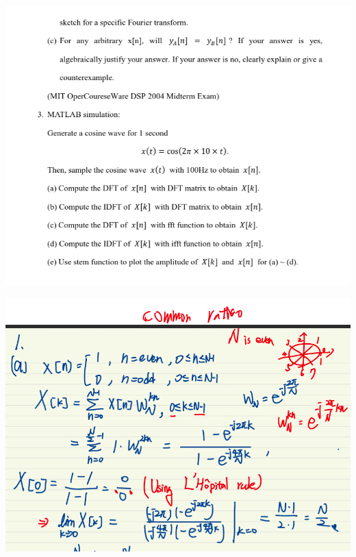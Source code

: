\documentclass[a4paper]{article}
\begin{document}
	\begin{center}
		\includegraphics[width=1\linewidth]{screenshot075}
	\end{center}
	
	
	
	\begin{center}
		\includegraphics[width=1\linewidth]{screenshot076}
	\end{center}
	
\end{document}

